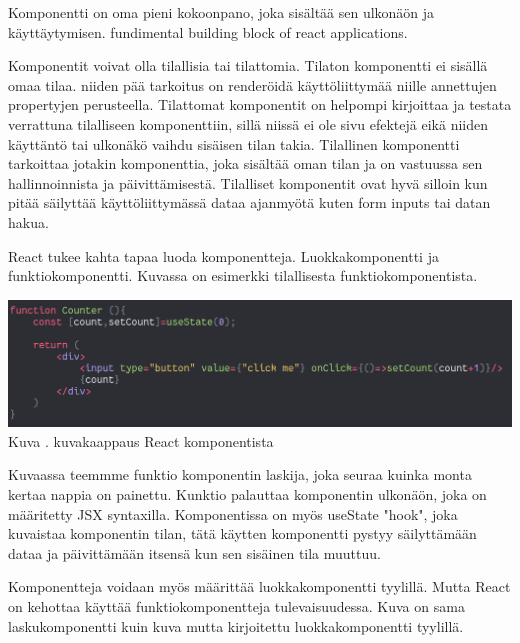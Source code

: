 Komponentti on oma pieni kokoonpano, joka sisältää sen ulkonäön ja käyttäytymisen.
fundimental building block of react applications.
\medskip



Komponentit voivat olla tilallisia tai tilattomia. 
%
Tilaton komponentti ei sisällä omaa tilaa. 
niiden pää tarkoitus on renderöidä käyttöliittymää niille annettujen propertyjen perusteella.
Tilattomat komponentit on helpompi kirjoittaa ja testata verrattuna tilalliseen komponenttiin, 
sillä niissä ei ole sivu efektejä eikä niiden käyttäntö tai ulkonäkö vaihdu sisäisen tilan takia.
%
Tilallinen komponentti tarkoittaa jotakin komponenttia, joka sisältää oman tilan ja on vastuussa sen hallinnoinnista ja päivittämisestä.
Tilalliset komponentit ovat hyvä silloin kun pitää säilyttää käyttöliittymässä dataa ajanmyötä kuten form inputs tai datan hakua.
\medskip


React tukee kahta tapaa luoda komponentteja. Luokkakomponentti ja funktiokomponentti.\citemissing
Kuvassa \nextImageCount {} on esimerkki tilallisesta funktiokomponentista.
\bigskip


\includegraphics[width=15cm]{src/public/oppar/function_component.png}\\
Kuva \getImgCount{}. kuvakaappaus React komponentista
\medskip

Kuvaassa teemmme funktio komponentin laskija, joka seuraa kuinka monta kertaa nappia on painettu.
Kunktio palauttaa komponentin ulkonäön, joka on määritetty JSX syntaxilla.
Komponentissa on myös useState "hook"{}, joka kuvaistaa komponentin tilan, tätä käytten komponentti pystyy säilyttämään dataa ja päivittämään itsensä kun sen sisäinen tila muuttuu.
\medskip

Komponentteja voidaan myös määrittää luokkakomponentti tyylillä. Mutta React on kehottaa käyttää funktiokomponentteja tulevaisuudessa. 
Kuva \nextImageCount {} on sama laskukomponentti kuin kuva \theimgCounter{} mutta kirjoitettu luokkakomponentti tyylillä. 
\medskip
\bigskip


